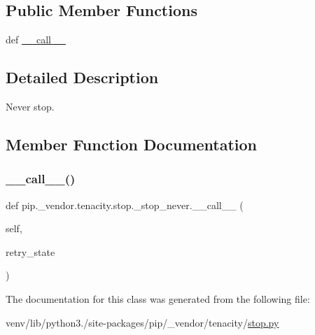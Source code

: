 \subsection*{Public Member Functions}
\begin{DoxyCompactItemize}
\item 
def \hyperlink{classpip_1_1__vendor_1_1tenacity_1_1stop_1_1__stop__never_ac7b5d4e2b4fa936029629f7b6900423f}{\+\_\+\+\_\+call\+\_\+\+\_\+}
\end{DoxyCompactItemize}


\subsection{Detailed Description}
\begin{DoxyVerb}Never stop.\end{DoxyVerb}
 

\subsection{Member Function Documentation}
\mbox{\label{classpip_1_1__vendor_1_1tenacity_1_1stop_1_1__stop__never_ac7b5d4e2b4fa936029629f7b6900423f}} 
\subsubsection{\texorpdfstring{\+\_\+\+\_\+call\+\_\+\+\_\+()}{\_\_call\_\_()}}
{\footnotesize\ttfamily def pip.\+\_\+vendor.\+tenacity.\+stop.\+\_\+stop\+\_\+never.\+\_\+\+\_\+call\+\_\+\+\_\+ (\begin{DoxyParamCaption}\item[{}]{self,  }\item[{}]{retry\+\_\+state }\end{DoxyParamCaption})}



The documentation for this class was generated from the following file\+:\begin{DoxyCompactItemize}
\item 
venv/lib/python3./site-\/packages/pip/\+\_\+vendor/tenacity/\hyperlink{stop_8py}{stop.\+py}\end{DoxyCompactItemize}
